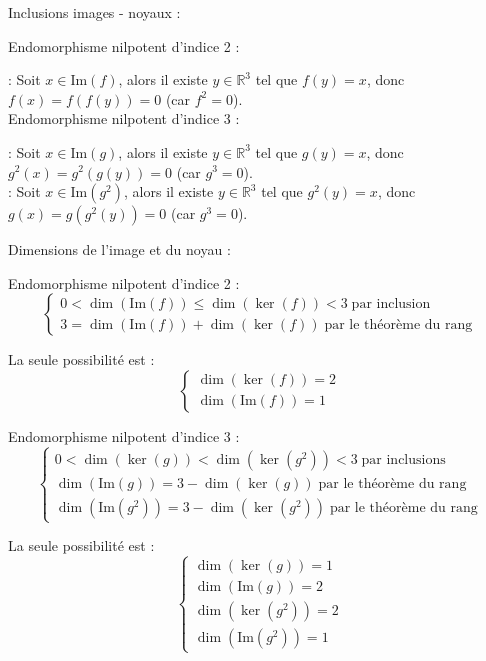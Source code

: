 \documentclass[10pt,a4paper]{article}
\begin{document}
\q Inclusions images - noyaux :

Endomorphisme nilpotent d'indice 2 :

 : Soit \(x \in \mathrm{Im}(f)\), alors il existe \(y \in
\mathbb{R}^3\) tel que \(f(y) = x\), donc \(f(x) = f(f(y)) = 0\) (car \(f^2 = 0\)).\\

Endomorphisme nilpotent d'indice 3 :

 : Soit \(x \in \mathrm{Im}(g)\), alors il existe \(y \in
\mathbb{R}^3\) tel que \(g(y) = x\), donc \(g^2(x) = g^2(g(y)) = 0\) (car \(g^3 = 0\)).\\
 : Soit \(x \in \mathrm{Im}(g^2)\), alors il existe \(y
\in \mathbb{R}^3\) tel que \(g^2(y) = x\), donc \(g(x) = g(g^2(y)) = 0\) (car \(g^3 = 0\)).

\q Dimensions de l'image et du noyau :

Endomorphisme nilpotent d'indice 2 :
\[
\begin{cases}
    0 < \dim(\mathrm{Im}(f)) \leq \dim(\ker(f)) < 3 \; \text{par inclusion} \\
    3 = \dim(\mathrm{Im}(f)) + \dim(\ker(f)) \; \text{par le théorème du rang}
\end{cases}
\]

La seule possibilité est :
\[
\begin{cases}
    \dim(\ker(f)) = 2\\
    \dim(\mathrm{Im}(f)) = 1
\end{cases}
\]

Endomorphisme nilpotent d'indice 3 :
\[
\begin{cases} 0 < \dim(\ker(g)) < \dim(\ker(g^2)) < 3 \; \text{par inclusions}\\
    \dim(\mathrm{Im}(g)) = 3 - \dim(\ker(g)) \; \text{par le théorème du rang}\\
    \dim(\mathrm{Im}(g^2)) = 3- \dim(\ker(g^2)) \; \text{par le théorème du rang}
\end{cases}
\]

La seule possibilité est :
\[
\begin{cases} \dim(\ker(g)) = 1\\
\dim(\mathrm{Im}(g)) = 2\\
\dim(\ker(g^2)) = 2\\
\dim(\mathrm{Im}(g^2)) = 1 \end{cases}
\]
\end{document}
